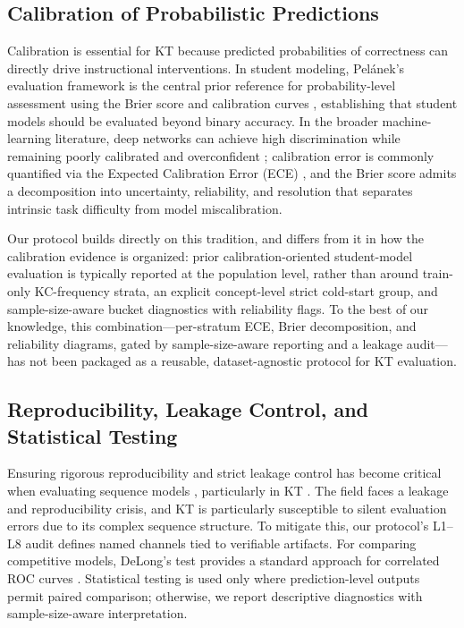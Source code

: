 \subsection{Calibration of Probabilistic Predictions}
Calibration is essential for KT because predicted probabilities of correctness can directly drive instructional interventions. In student modeling, Pel{\'a}nek's evaluation framework is the central prior reference for probability-level assessment using the Brier score and calibration curves \citep{pelanek2015metrics}, establishing that student models should be evaluated beyond binary accuracy. In the broader machine-learning literature, deep networks can achieve high discrimination while remaining poorly calibrated and overconfident \citep{guo2017calibration}; calibration error is commonly quantified via the Expected Calibration Error (ECE) \citep{naeini2015obtaining}, and the Brier score \citep{brier1950verification} admits a decomposition into uncertainty, reliability, and resolution \citep{degroot1983comparison} that separates intrinsic task difficulty from model miscalibration.

Our protocol builds directly on this tradition, and differs from it in how the calibration evidence is organized: prior calibration-oriented student-model evaluation is typically reported at the population level, rather than around train-only KC-frequency strata, an explicit concept-level strict cold-start group, and sample-size-aware bucket diagnostics with reliability flags. To the best of our knowledge, this combination---per-stratum ECE, Brier decomposition, and reliability diagrams, gated by sample-size-aware reporting and a leakage audit---has not been packaged as a reusable, dataset-agnostic protocol for KT evaluation.

\subsection{Reproducibility, Leakage Control, and Statistical Testing}
Ensuring rigorous reproducibility and strict leakage control has become critical when evaluating sequence models \citep{kapoor2023leakage}, particularly in KT \citep{gervet2020deep}. The field faces a leakage and reproducibility crisis, and KT is particularly susceptible to silent evaluation errors due to its complex sequence structure. To mitigate this, our protocol's L1--L8 audit defines named channels tied to verifiable artifacts. For comparing competitive models, DeLong's test provides a standard approach for correlated ROC curves \citep{delong1988comparing}. Statistical testing is used only where prediction-level outputs permit paired comparison; otherwise, we report descriptive diagnostics with sample-size-aware interpretation.

